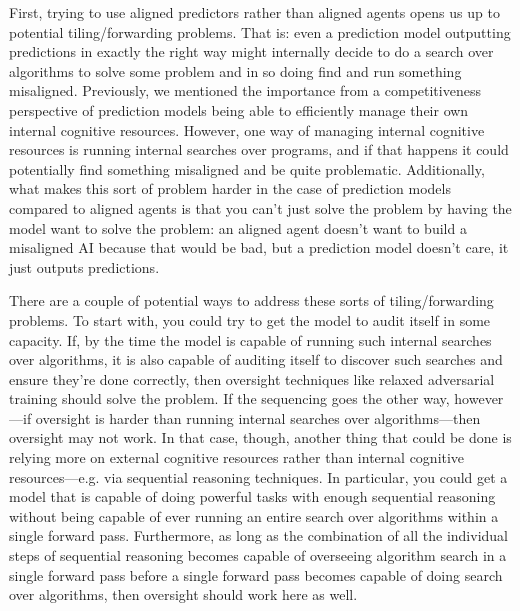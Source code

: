 {First, trying to use aligned predictors rather than aligned agents opens us up to potential tiling\cite{TODO: cite http://intelligence.org/files/TilingAgentsDraft.pdf}/forwarding\cite{TODO: cite https://www.alignmentforum.org/posts/bzkCWEHG2tprB3eq2/attempts-at-forwarding-speed-priors} problems. That is: even a prediction model outputting predictions in exactly the right way might internally decide to do a search over algorithms to solve some problem and in so doing find and run something misaligned. Previously\cite{TODO: cite TODO}, we mentioned the importance from a competitiveness perspective of prediction models being able to efficiently manage their own internal cognitive resources. However, one way of managing internal cognitive resources is running internal searches over programs, and if that happens it could potentially find something misaligned and be quite problematic. Additionally, what makes this sort of problem harder in the case of prediction models compared to aligned agents is that you can't just solve the problem by having the model want to solve the problem: an aligned agent doesn't want to build a misaligned AI because that would be bad, but a prediction model doesn't care, it just outputs predictions.

There are a couple of potential ways to address these sorts of tiling/forwarding problems. To start with, you could try to get the model to audit itself in some capacity. If, by the time the model is capable of running such internal searches over algorithms, it is also capable of auditing itself to discover such searches and ensure they're done correctly, then oversight techniques like relaxed adversarial training\cite{TODO: cite https://www.alignmentforum.org/posts/9Dy5YRaoCxH9zuJqa/relaxed-adversarial-training-for-inner-alignment} should solve the problem. If the sequencing goes the other way, however---if oversight is harder than running internal searches over algorithms---then oversight may not work. In that case, though, another thing that could be done is relying more on external cognitive resources rather than internal cognitive resources---e.g. via sequential reasoning techniques. In particular, you could get a model that is capable of doing powerful tasks with enough sequential reasoning without being capable of ever running an entire search over algorithms within a single forward pass. Furthermore, as long as the combination of all the individual steps of sequential reasoning becomes capable of overseeing algorithm search in a single forward pass before a single forward pass becomes capable of doing search over algorithms, then oversight should work here as well.

}
